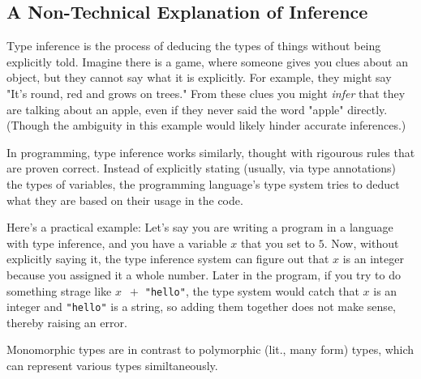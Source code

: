 \documentclass{l4proj}
\begin{document}
\subsection{A Non-Technical Explanation of Inference}
\label{sec:non-technical-inference-explanation}

Type inference is the process of deducing the types of things without being explicitly told.
Imagine there is a game, where someone gives you clues about an object, but they cannot say what it is explicitly.
For example, they might say "It's round, red and grows on trees."
From these clues you might \emph{infer} that they are talking about an apple, even if they never said the word "apple" directly. 
(Though the ambiguity in this example would likely hinder accurate inferences.)

In programming, type inference works similarly, thought with rigourous rules that are proven correct.
Instead of explicitly stating (usually, via type annotations) the types of variables, the programming language's type system tries to deduct what they are based on their usage in the code.


Here's a practical example: Let's say you are writing a program in a language with type inference, and you have a variable $x$ that you set to $5$.
Now, without explicitly saying it, the type inference system can figure out that $x$ is an integer because you assigned it a whole number.
Later in the program, if you try to do something strage like $x \;\: +$ \texttt{"hello"}, the type system would catch that $x$ is an integer and \texttt{"hello"} is a string, so adding them together does not make sense, thereby raising an error.




Monomorphic types are in contrast to polymorphic (lit., many form) types, which can represent various types similtaneously.






\end{document}
